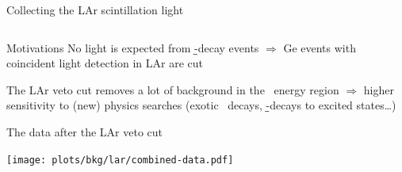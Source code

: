 \documentclass[10pt,aspectratio=169]{beamer}
\begin{document}
\begin{frame}{Collecting the LAr scintillation light}
\begin{columns}
\begin{tikzpicture}
        \end{tikzpicture}
  \end{columns}
\end{frame}
\begin{frame}{Motivations}
  No light is expected from \b\b-decay events $\Rightarrow$ Ge events with
  coincident light detection in LAr are cut

  The LAr veto cut removes a lot of background in the \nnbb\ energy region
  $\Rightarrow$ higher sensitivity to (new) physics searches (exotic \nnbb\
  decays, \b\b-decays to excited states\ldots)
\end{frame}
\begin{frame}[plain]{The data after the LAr veto cut}
  \begin{center}
    \texttt{[image: plots/bkg/lar/combined-data.pdf]}
  \end{center}
\end{frame}
\end{document}
